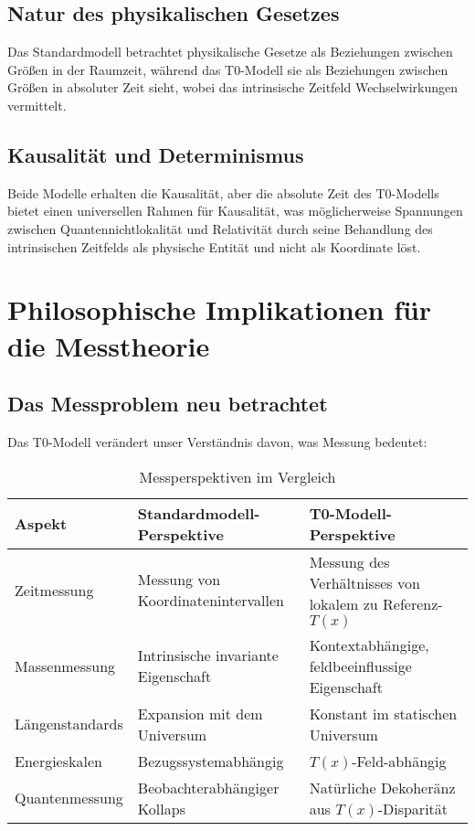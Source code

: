 \documentclass[12pt,a4paper]{article}
\newcommand{\Tfield}{T(x)}
\begin{document}
	\subsection{Natur des physikalischen Gesetzes}
	Das Standardmodell betrachtet physikalische Gesetze als Beziehungen zwischen Größen in der Raumzeit, während das T0-Modell sie als Beziehungen zwischen Größen in absoluter Zeit sieht, wobei das intrinsische Zeitfeld Wechselwirkungen vermittelt.
	
	\subsection{Kausalität und Determinismus}
	Beide Modelle erhalten die Kausalität, aber die absolute Zeit des T0-Modells bietet einen universellen Rahmen für Kausalität, was möglicherweise Spannungen zwischen Quantennichtlokalität und Relativität durch seine Behandlung des intrinsischen Zeitfelds als physische Entität und nicht als Koordinate löst.
	
	\section{Philosophische Implikationen für die Messtheorie}
	
	\subsection{Das Messproblem neu betrachtet}
	
	Das T0-Modell verändert unser Verständnis davon, was Messung bedeutet:
	
	\begin{table}[h]
		\centering
		\begin{tabular}{>{\RaggedRight}p{} >{\RaggedRight}p{} >{\RaggedRight}p{}}
			\toprule
			\textbf{Aspekt} & \textbf{Standardmodell-Perspektive} & \textbf{T0-Modell-Perspektive} \\
			\midrule
			Zeitmessung & Messung von Koordinatenintervallen & Messung des Verhältnisses von lokalem zu Referenz-$\Tfield$ \\
			Massenmessung & Intrinsische invariante Eigenschaft & Kontextabhängige, feldbeeinflussige Eigenschaft \\
			Längenstandards & Expansion mit dem Universum & Konstant im statischen Universum \\
			Energieskalen & Bezugssystemabhängig & $\Tfield$-Feld-abhängig \\
			Quantenmessung & Beobachterabhängiger Kollaps & Natürliche Dekoheränz aus $\Tfield$-Disparität \\
			\bottomrule
		\end{tabular}
		\caption{Messperspektiven im Vergleich}
	\end{table}
	
\end{document}
